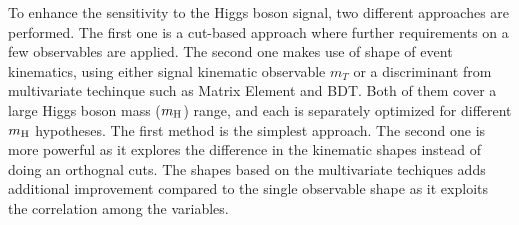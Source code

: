 To enhance the sensitivity to the Higgs boson signal, two different approaches 
are performed. The first one is a cut-based approach where further requirements 
on a few observables are applied. The second one makes use of shape of 
event kinematics, using either signal kinematic observable $m_T$ or 
a discriminant from multivariate techinque such as Matrix Element and BDT. 
Both of them cover a large Higgs boson mass ($m_{\rm{H}}$) range, 
and each is separately optimized for different
$m_{\rm{H}}$ hypotheses. The first method is the simplest approach. 
The second one is more powerful as it explores the difference in the kinematic 
shapes instead of doing an orthognal cuts. 
The shapes based on the multivariate techiques adds additional improvement 
compared to the single observable shape as it exploits the 
correlation among the variables. 
		







